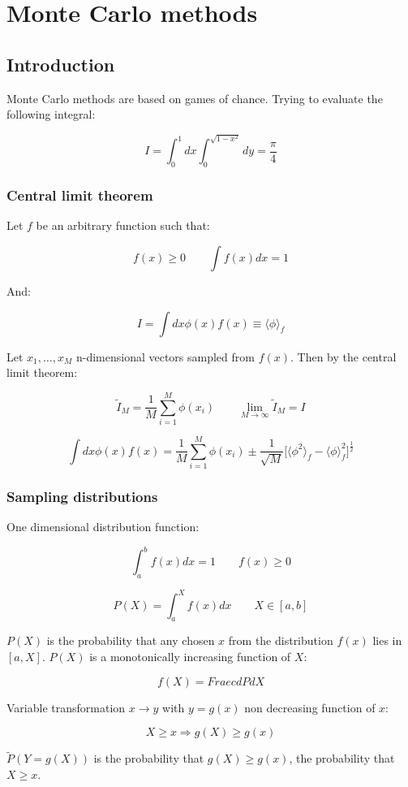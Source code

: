 \graphicspath{{chapters/17/images}}
\chapter{Monte Carlo methods}

\section{Introduction}
Monte Carlo methods are based on games of chance.
Trying to evaluate the following integral:

$$I = \int_0^1dx\int_0^{\sqrt{1-x^2}}dy = \frac{\pi}{4}$$

	\subsection{Central limit theorem}
	Let $f$ be an arbitrary function such that:

	$$f(x)\ge 0\qquad \int f(x)dx = 1$$

	And:

	$$I = \int dx\phi(x)f(x)\equiv\langle\phi\rangle_f$$

	Let $x_1, \dots, x_M$ n-dimensional vectors sampled from $f(x)$.
	Then by the central limit theorem:

	$$\tilde{I}_M = \frac{1}{M}\sum\limits_{i=1}^M\phi(x_i)\qquad \lim\limits_{M\rightarrow\infty}\tilde{I}_M = I$$

	$$\int dx\phi(x)f(x) = \frac{1}{M}\sum\limits_{i=1}^M\phi(x_i)\pm\frac{1}{\sqrt{M}}\bigl[\langle\phi^2\rangle_f-\langle\phi\rangle_f^2\bigr]^{\frac{1}{2}}$$

	\subsection{Sampling distributions}
	One dimensional distribution function:

	$$\int_a^bf(x)dx = 1\qquad f(x)\ge 0$$

	$$P(X) = \int_a^X f(x)dx\qquad X\in[a,b]$$

	$P(X)$ is the probability that any chosen $x$ from the distribution $f(x)$ lies in $[a, X]$.
	$P(X)$ is a monotonically increasing function of $X$:

	$$f(X) = Fraec{dP}{dX}$$

	Variable transformation $x\rightarrow y$ with $y = g(x)$ non decreasing function of $x$:

	$$X\ge x \Rightarrow g(X) \ge g(x)$$

	$\tilde{P}(Y=g(X))$ is the probability that $g(X)\ge g(x)$, the probability that $X\ge x$.

